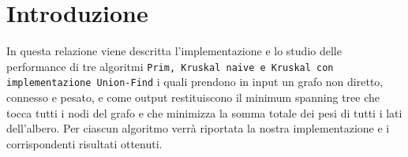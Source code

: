 \section{Introduzione}
\label{Introduzione}

In questa relazione viene descritta l'implementazione e lo studio delle performance di tre algoritmi \texttt{Prim, Kruskal naive e Kruskal con implementazione Union-Find} i quali prendono in input un grafo non diretto, connesso e pesato, e come output restituiscono il minimum spanning tree che tocca tutti i nodi del grafo e che minimizza la somma totale dei pesi di tutti i lati dell'albero.
Per ciascun algoritmo verrà riportata la nostra implementazione e i corrispondenti risultati ottenuti.

